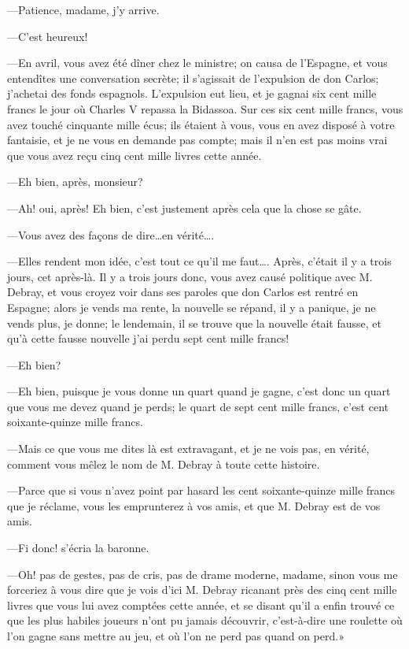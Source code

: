 —Patience, madame, j'y arrive. 

—C'est heureux! 

—En avril, vous avez été dîner chez le ministre; on causa de l'Espagne, et vous entendîtes une conversation secrète; il s'agissait de l'expulsion de don Carlos; j'achetai des fonds espagnols. L'expulsion eut lieu, et je gagnai six cent mille francs le jour où Charles V repassa la Bidassoa. Sur ces six cent mille francs, vous avez touché cinquante mille écus; ils étaient à vous, vous en avez disposé à votre fantaisie, et je ne vous en demande pas compte; mais il n'en est pas moins vrai que vous avez reçu cinq cent mille livres cette année. 

—Eh bien, après, monsieur? 

—Ah! oui, après! Eh bien, c'est justement après cela que la chose se gâte. 

—Vous avez des façons de dire\dots en vérité\dots. 

—Elles rendent mon idée, c'est tout ce qu'il me faut\dots. Après, c'était il y a trois jours, cet après-là. Il y a trois jours donc, vous avez causé politique avec M. Debray, et vous croyez voir dans ses paroles que don Carlos est rentré en Espagne; alors je vends ma rente, la nouvelle se répand, il y a panique, je ne vends plus, je donne; le lendemain, il se trouve que la nouvelle était fausse, et qu'à cette fausse nouvelle j'ai perdu sept cent mille francs! 

—Eh bien? 

—Eh bien, puisque je vous donne un quart quand je gagne, c'est donc un quart que vous me devez quand je perds; le quart de sept cent mille francs, c'est cent soixante-quinze mille francs. 

—Mais ce que vous me dites là est extravagant, et je ne vois pas, en vérité, comment vous mêlez le nom de M. Debray à toute cette histoire. 

—Parce que si vous n'avez point par hasard les cent soixante-quinze mille francs que je réclame, vous les emprunterez à vos amis, et que M. Debray est de vos amis. 

—Fi donc! s'écria la baronne. 

—Oh! pas de gestes, pas de cris, pas de drame moderne, madame, sinon vous me forceriez à vous dire que je vois d'ici M. Debray ricanant près des cinq cent mille livres que vous lui avez comptées cette année, et se disant qu'il a enfin trouvé ce que les plus habiles joueurs n'ont pu jamais découvrir, c'est-à-dire une roulette où l'on gagne sans mettre au jeu, et où l'on ne perd pas quand on perd.» 


